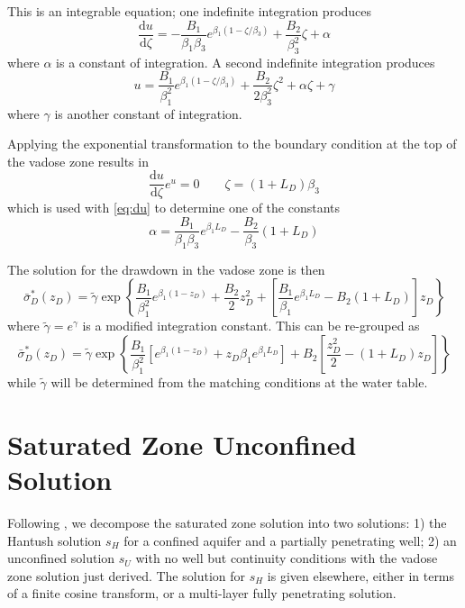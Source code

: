 \documentclass[12pt,letterpaper]{article}
\begin{document}
This is an integrable equation; one indefinite integration produces
\begin{equation}
  \label{eq:du}
  \frac{\mathrm{d} u}{\mathrm{d}\zeta} = - \frac{B_1}{\beta_1 \beta_3} e^{\beta_1(1-\zeta/\beta_3)} + \frac{B_2}{\beta_3^2}\zeta + \alpha
\end{equation}
where $\alpha$ is a constant of integration. A second indefinite integration produces
\begin{equation}\nonumber
 u =  \frac{B_1}{\beta_1^2} e^{\beta_1 (1-\zeta/\beta_3)} + \frac{B_2}{2\beta_3^2}\zeta^2 + \alpha\zeta + \gamma  
\end{equation}
where $\gamma$ is another constant of integration.  

Applying the exponential transformation to the boundary condition at the top of the vadose zone results in
\begin{equation}\nonumber
\frac{\mathrm{d}u}{\mathrm{d}\zeta} e^u=0 \qquad \zeta= \left(1+ L_D \right) \beta_3
\end{equation}
which is used with \eqref{eq:du} to determine one of the constants
\begin{equation}\nonumber
\alpha= \frac{B_1}{\beta_1 \beta_3} e^{\beta_1 L_D} -
\frac{B_2}{\beta_3} \left( 1+L_D \right) 
\end{equation}

The solution for the drawdown in the vadose zone is then
\begin{equation}
  \nonumber
  \bar{\sigma}_D^{\ast} (z_D) = \tilde{\gamma}\exp\left\{
    \frac{B_1}{\beta_1^2} e^{\beta_1 (1-z_D)} + \frac{B_2}{2}z_D^2
    +\left[ \frac{B_1}{\beta_1} e^{\beta_1 L_D}  - B_2 \left( 1+L_D\right) \right]z_D  \right\}
\end{equation}
where $\tilde{\gamma}=e^\gamma$ is a modified integration constant. This can be re-grouped as
\begin{equation}
  \label{eq:sigma}
  \bar{\sigma}_D^{\ast} (z_D) = \tilde{\gamma}\exp\left\{
    \frac{B_1}{\beta_1^2} \left[ e^{\beta_1 (1-z_D)} + z_D\beta_1 e^{\beta_1
        L_D} \right] + B_2 \left[ \frac{z_D^2}{2}
     - \left( 1+L_D\right)z_D  \right] \right\}
\end{equation}
while $\tilde{\gamma}$ will be determined from the matching conditions at the water table.
\section{Saturated Zone Unconfined Solution}
Following \cite{mishra10}, we decompose the saturated zone solution into two solutions: 1) the Hantush solution $s_H$ for a confined aquifer and a partially penetrating well; 2) an unconfined solution $s_U$ with no well but continuity conditions with the vadose zone solution just derived.  The solution for $s_H$ is given elsewhere, either in terms of a finite cosine transform, or a multi-layer fully penetrating solution.  
\end{document}
